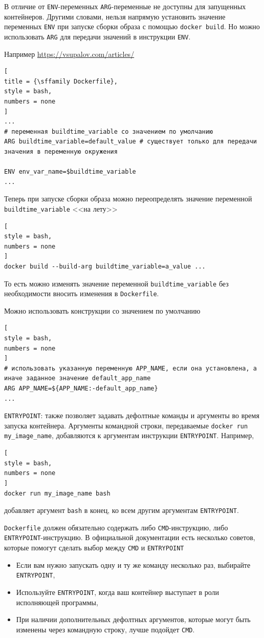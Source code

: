 \documentclass[%
	11pt,
	a4paper,
	utf8,
		]{article}
\begin{document}
В отличие от \texttt{ENV}-переменных \texttt{ARG}-переменные не доступны для запущенных контейнеров. Другими словами, нельзя напрямую установить значение переменных \texttt{ENV} при запуске сборки образа с помощью \texttt{docker build}. Но можно использовать \texttt{ARG} для передачи значений в инструкции \texttt{ENV}.

Например \url{https://vsupalov.com/articles/}
\begin{lstlisting}[
title = {\sffamily Dockerfile},
style = bash,
numbers = none	
]
...
# переменная buildtime_variable со значением по умолчанию
ARG buildtime_variable=default_value # существует только для передачи значения в переменную окружения

ENV env_var_name=$buildtime_variable
...
\end{lstlisting}

Теперь при запуске сборки образа можно переопределять значение переменной \verb|buildtime_variable| <<на лету>>
\begin{lstlisting}[
style = bash,
numbers = none	
]
docker build --build-arg buildtime_variable=a_value ...
\end{lstlisting}

То есть можно изменять значение переменной \verb|buildtime_variable| без необходимости вносить изменения в \texttt{Dockerfile}.

Можно использовать конструкции со значением по умолчанию
\begin{lstlisting}[
style = bash,
numbers = none
]
# использовать указанную переменную APP_NAME, если она установлена, а иначе заданное значение default_app_name
ARG APP_NAME=${APP_NAME:-default_app_name}
...
\end{lstlisting}

\texttt{ENTRYPOINT}: также позволяет задавать дефолтные команды и аргументы во время запуска контейнера. Аргументы командной строки, передаваемые \texttt{docker run my\_image\_name}, добавляются к аргументам инструкции \texttt{ENTRYPOINT}. Например,
\begin{lstlisting}[
style = bash,
numbers = none	
]
docker run my_image_name bash
\end{lstlisting}
добавляет аргумент \texttt{bash} в конец, ко всем другим аргументам \texttt{ENTRYPOINT}.

\texttt{Dockerfile} должен обязательно содержать либо \texttt{CMD}-инструкцию, либо \texttt{ENTRYPOINT}-инструкцию. В официальной документации есть несколько советов, которые помогут сделать выбор между \texttt{CMD} и \texttt{ENTRYPOINT}
\begin{itemize}
	\item Если вам нужно запускать одну и ту же команду несколько раз, выбирайте \texttt{ENTRYPOINT},
	
	\item Используйте \texttt{ENTRYPOINT}, когда ваш контейнер выступает в роли исполняющей программы,
	
	\item При наличии дополнительных дефолтных аргументов, которые могут быть изменены через командную строку, лучше подойдет \texttt{CMD}.
\end{itemize}
\end{document}
